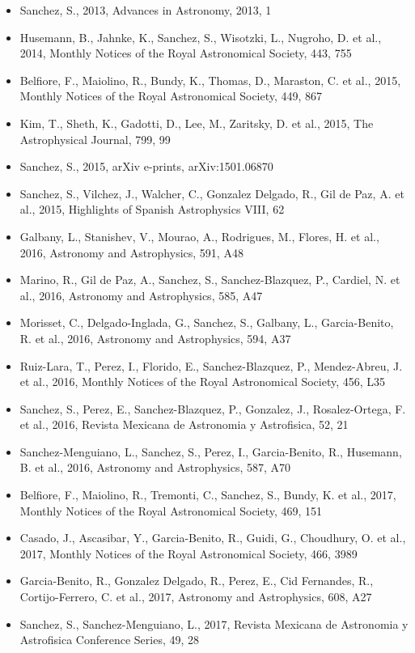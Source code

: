 \documentclass{letter}
\begin{document}
\begin{enumerate}
\begin{itemize}
\item Sanchez, S., 2013, Advances in Astronomy, 2013, 1
\item Husemann, B., Jahnke, K., Sanchez, S., Wisotzki, L., Nugroho, D. et al., 2014, Monthly Notices of the Royal Astronomical Society, 443, 755
\item Belfiore, F., Maiolino, R., Bundy, K., Thomas, D., Maraston, C. et al., 2015, Monthly Notices of the Royal Astronomical Society, 449, 867
\item Kim, T., Sheth, K., Gadotti, D., Lee, M., Zaritsky, D. et al., 2015, The Astrophysical Journal, 799, 99
\item Sanchez, S., 2015, arXiv e-prints, arXiv:1501.06870
\item Sanchez, S., Vilchez, J., Walcher, C., Gonzalez Delgado, R., Gil de Paz, A. et al., 2015, Highlights of Spanish Astrophysics VIII, 62
\item Galbany, L., Stanishev, V., Mourao, A., Rodrigues, M., Flores, H. et al., 2016, Astronomy and Astrophysics, 591, A48
\item Marino, R., Gil de Paz, A., Sanchez, S., Sanchez-Blazquez, P., Cardiel, N. et al., 2016, Astronomy and Astrophysics, 585, A47
\item Morisset, C., Delgado-Inglada, G., Sanchez, S., Galbany, L., Garcia-Benito, R. et al., 2016, Astronomy and Astrophysics, 594, A37
\item Ruiz-Lara, T., Perez, I., Florido, E., Sanchez-Blazquez, P., Mendez-Abreu, J. et al., 2016, Monthly Notices of the Royal Astronomical Society, 456, L35
\item Sanchez, S., Perez, E., Sanchez-Blazquez, P., Gonzalez, J., Rosalez-Ortega, F. et al., 2016, Revista Mexicana de Astronomia y Astrofisica, 52, 21
\item Sanchez-Menguiano, L., Sanchez, S., Perez, I., Garcia-Benito, R., Husemann, B. et al., 2016, Astronomy and Astrophysics, 587, A70
\item Belfiore, F., Maiolino, R., Tremonti, C., Sanchez, S., Bundy, K. et al., 2017, Monthly Notices of the Royal Astronomical Society, 469, 151
\item Casado, J., Ascasibar, Y., Garcia-Benito, R., Guidi, G., Choudhury, O. et al., 2017, Monthly Notices of the Royal Astronomical Society, 466, 3989
\item Garcia-Benito, R., Gonzalez Delgado, R., Perez, E., Cid Fernandes, R., Cortijo-Ferrero, C. et al., 2017, Astronomy and Astrophysics, 608, A27
\item Sanchez, S., Sanchez-Menguiano, L., 2017, Revista Mexicana de Astronomia y Astrofisica Conference Series, 49, 28

\end{itemize}
\end{enumerate}
\end{document}
